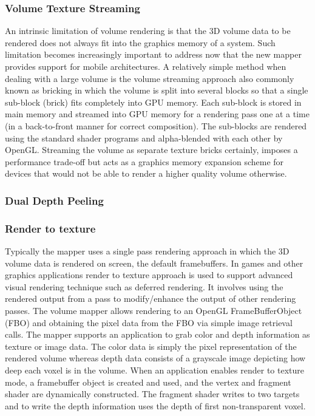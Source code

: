 \subsubsection{Volume Texture Streaming}
An intrinsic limitation of volume rendering is that the 3D volume data to be rendered does not always fit into the graphics memory of a system. Such limitation becomes increasingly important to address now that the new mapper provides support for mobile architectures.
A relatively simple method when dealing with a large volume is the volume streaming approach also commonly known as bricking in which the volume is split into several blocks so that a single sub-block (brick) fits completely into GPU memory.  Each sub-block is stored in main memory and streamed into GPU memory for a rendering pass one at a time (in a back-to-front manner for correct composition). The sub-blocks are rendered using the standard shader programs and alpha-blended with each other by OpenGL. Streaming the volume as separate texture bricks certainly, imposes a performance trade-off but acts as a graphics memory expansion scheme for devices that would not be able to render a higher quality volume otherwise.

\subsubsection{Dual Depth Peeling}
 
 
\subsubsection{Render to texture}
Typically the mapper uses a single pass rendering approach in which the 3D volume data is rendered on screen, the default framebuffers. In games and other graphics applications render to texture approach is used to support advanced visual rendering technique such as deferred rendering. It involves using the rendered output from a pass to modify/enhance the output of other rendering passes. The volume mapper allows rendering to an OpenGL FrameBufferObject (FBO) and obtaining the pixel data from the FBO via simple image retrieval calls. The mapper supports an application to grab color and depth information as texture or image data. The color data is simply the pixel representation of the rendered volume whereas depth data consists of a grayscale image depicting how deep each voxel is in the volume. When an application enables render to texture mode, a framebuffer object is created and used, and the vertex and fragment shader are dynamically constructed.  The fragment shader writes to two targets and to write the depth information uses the depth of first non-transparent voxel. 

